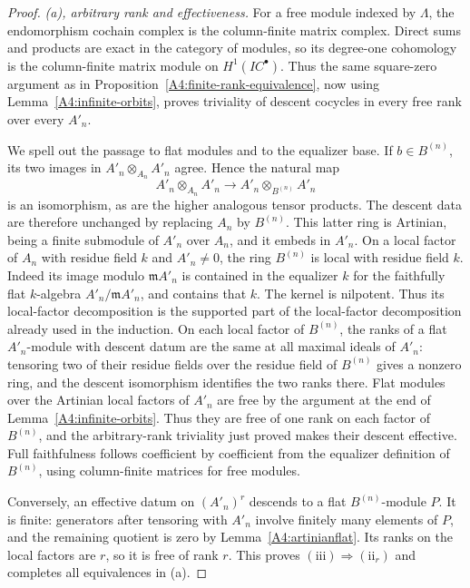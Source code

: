 \begin{proof}
\emph{(a), arbitrary rank and effectiveness.}
For a free module indexed by $\Lambda$, the endomorphism cochain complex
is the column-finite matrix complex.  Direct sums and products are exact
in the category of modules, so its degree-one cohomology is the
column-finite matrix module on $H^1(IC^\bullet)$.  Thus the same
square-zero argument as in Proposition~\ref{A4:finite-rank-equivalence},
now using Lemma~\ref{A4:infinite-orbits}, proves triviality of descent
cocycles in every free rank over every $A'_n$.

We spell out the passage to flat modules and to the equalizer base.
If $b\in B^{(n)}$, its two images in $A'_n\otimes_{A_n}A'_n$ agree.
Hence the natural map
\[
 A'_n\otimes_{A_n}A'_n\longrightarrow
 A'_n\otimes_{B^{(n)}}A'_n
\]
is an isomorphism, as are the higher analogous tensor products.
The descent data are therefore unchanged by replacing $A_n$ by
$B^{(n)}$.  This latter ring is Artinian, being a finite submodule of
$A'_n$ over $A_n$, and it embeds in $A'_n$.
On a local factor of $A_n$ with residue field $k$ and $A'_n\ne0$,
the ring $B^{(n)}$ is local with residue field $k$.  Indeed its image
modulo $\mathfrak mA'_n$ is contained in the equalizer $k$ for the
faithfully flat $k$-algebra $A'_n/\mathfrak mA'_n$, and contains that
$k$.  The kernel is nilpotent.  Thus its local-factor decomposition is
the supported part of the local-factor decomposition already used in
the induction.
On each local factor of $B^{(n)}$, the ranks of a flat $A'_n$-module with
descent datum are the same at all maximal ideals of $A'_n$: tensoring
two of their residue fields over the residue field of $B^{(n)}$ gives
a nonzero ring, and the descent isomorphism identifies the two ranks
there.  Flat modules over the Artinian local factors of $A'_n$ are free
by the argument at the end of Lemma~\ref{A4:infinite-orbits}.
Thus they are free of one rank on each factor of $B^{(n)}$, and the
arbitrary-rank triviality just proved makes their descent effective.
Full faithfulness follows coefficient by coefficient from the equalizer
definition of $B^{(n)}$, using column-finite matrices for free modules.

Conversely, an effective datum on $(A'_n)^r$ descends to a flat
$B^{(n)}$-module $P$.  It is finite: generators after tensoring with
$A'_n$ involve finitely many elements of $P$, and the remaining quotient
is zero by Lemma~\ref{A4:artinianflat}.  Its ranks on the local factors
are $r$, so it is free of rank $r$.  This proves $(\mathrm{iii})\Rightarrow
(\mathrm{ii}_r)$ and completes all equivalences in (a).


\end{proof}
